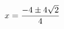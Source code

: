\documentclass[preview]{standalone}
\begin{document}
\begin{align*}
\special{dvisvgm:raw <g id='unique000'>}x=\frac{-4\pm 4 \sqrt{2}}{4}\special{dvisvgm:raw </g>}
\end{align*}
\end{document}
